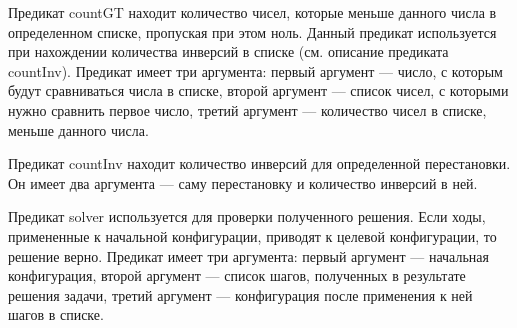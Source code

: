 \documentclass{article}
\begin{document}
Предикат countGT находит количество чисел, которые меньше данного
числа в определенном списке, пропуская при этом ноль. Данный предикат
используется при нахождении количества инверсий в списке (см. описание
предиката countInv). Предикат имеет три аргумента: первый аргумент ---
число, с которым будут сравниваться числа в списке, второй аргумент
--- список чисел, с которыми нужно сравнить первое число, третий
аргумент --- количество чисел в списке, меньше данного числа.

Предикат countInv находит количество инверсий для определенной
перестановки. Он имеет два аргумента --- саму перестановку и
количество инверсий в ней.

Предикат solver используется для проверки полученного решения. Если
ходы, примененные к начальной конфигурации, приводят к целевой
конфигурации, то решение верно. Предикат имеет три аргумента: первый
аргумент --- начальная конфигурация, второй аргумент --- список шагов,
полученных в результате решения задачи, третий аргумент ---
конфигурация после применения к ней шагов в списке.
\end{document}
